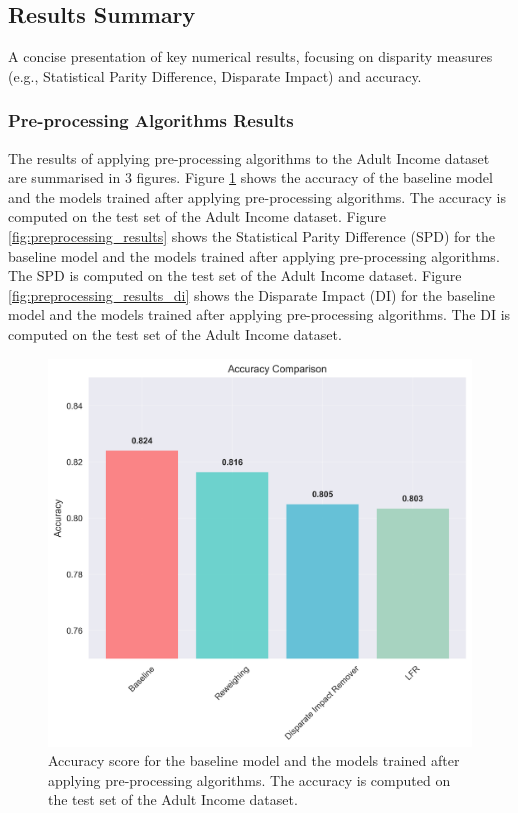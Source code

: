 \documentclass[12pt,a4paper,openright,twoside]{book}
\begin{document}
\subsection{Results Summary}
A concise presentation of key numerical results, focusing on disparity measures (e.g., Statistical Parity Difference, Disparate Impact) and accuracy.
\subsubsection{Pre-processing Algorithms Results}
The results of applying pre-processing algorithms to the Adult Income dataset are summarised in 3 figures. Figure \ref{fig:baseline_results} shows the accuracy of the baseline model and the models trained after applying pre-processing algorithms. The accuracy is computed on the test set of the Adult Income dataset.
Figure \ref{fig:preprocessing_results} shows the Statistical Parity Difference (SPD) for the baseline model and the models trained after applying pre-processing algorithms. The SPD is computed on the test set of the Adult Income dataset. Figure \ref{fig:preprocessing_results_di} shows the Disparate Impact (DI) for the baseline model and the models trained after applying pre-processing algorithms. The DI is computed on the test set of the Adult Income dataset.

\begin{figure}
    \centering
    \includegraphics[width=\textwidth]{figures/preprocessing_results/accuracy_comparison_chart.png}
    \caption{Accuracy score for the baseline model and the models trained after applying pre-processing algorithms. The accuracy is computed on the test set of the Adult Income dataset.}
    \label{fig:baseline_results}
\end{figure}
\end{document}

